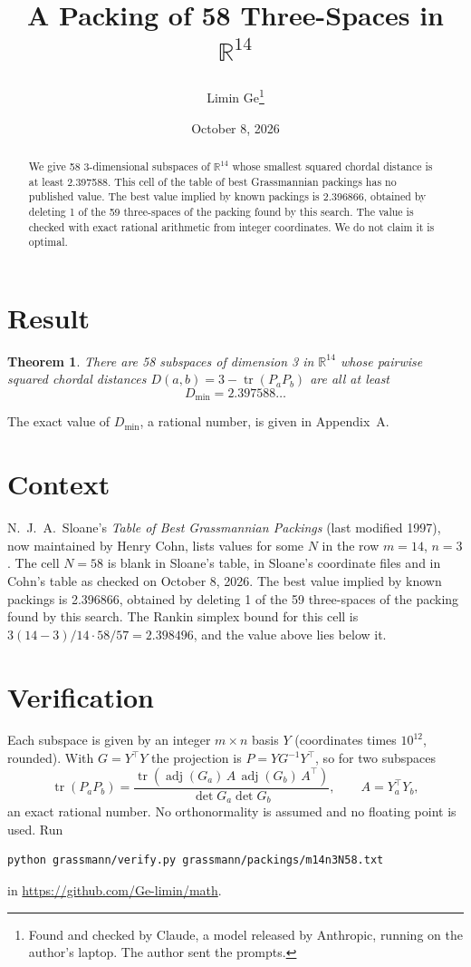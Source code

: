 \documentclass[11pt,a4paper]{article}
\title{A Packing of 58 Three-Spaces in $\mathbb{R}^{14}$}
\author{Limin Ge\thanks{Found and checked by Claude, a model released by Anthropic, running on the author's laptop. The author sent the prompts.}}
\date{October 8, 2026}
\newtheorem*{theorem}{Theorem}
\begin{document}
\maketitle
\begin{abstract}
We give 58 3-dimensional subspaces of $\mathbb{R}^{14}$ whose smallest squared chordal distance is at least 2.397588. This cell of the table of best Grassmannian packings has no published value. The best value implied by known packings is 2.396866, obtained by deleting 1 of the 59 three-spaces of the packing found by this search. The value is checked with exact rational arithmetic from integer coordinates. We do not claim it is optimal.
\end{abstract}

\section{Result}
\begin{theorem}
There are 58 subspaces of dimension 3 in $\mathbb{R}^{14}$ whose pairwise squared chordal distances $D(a,b) = 3 - \operatorname{tr}(P_aP_b)$ are all at least
\[ D_{\min} = 2.397588\ldots \]
\end{theorem}
The exact value of $D_{\min}$, a rational number, is given in Appendix~A.


\section{Context}
N.~J.~A.~Sloane's \emph{Table of Best Grassmannian Packings} (last modified 1997), now maintained by Henry Cohn, lists values for some $N$ in the row $m=14$, $n=3$. The cell $N=58$ is blank in Sloane's table, in Sloane's coordinate files and in Cohn's table as checked on October 8, 2026. The best value implied by known packings is 2.396866, obtained by deleting 1 of the 59 three-spaces of the packing found by this search. The Rankin simplex bound for this cell is $3(14-3)/14\cdot 58/57 = 2.398496$, and the value above lies below it.


\section{Verification}
Each subspace is given by an integer $m\times n$ basis $Y$ (coordinates times $10^{12}$, rounded). With $G=Y^\top Y$ the projection is $P=YG^{-1}Y^\top$, so for two subspaces
\[ \operatorname{tr}(P_aP_b)=\frac{\operatorname{tr}(\operatorname{adj}(G_a)\,A\,\operatorname{adj}(G_b)\,A^\top)}{\det G_a\det G_b},\qquad A=Y_a^\top Y_b, \]
an exact rational number. No orthonormality is assumed and no floating point is used. Run
\begin{verbatim}
python grassmann/verify.py grassmann/packings/m14n3N58.txt
\end{verbatim}
in \url{https://github.com/Ge-limin/math}.
\end{document}
